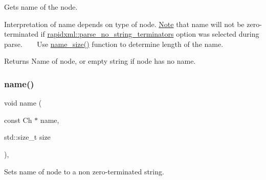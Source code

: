 Gets name of the node. 

Interpretation of name depends on type of node. \mbox{\hyperlink{classNote}{Note}} that name will not be zero-\/terminated if \mbox{\hyperlink{namespacerapidxml_a9cae3801e70437cbc410c24bf6be691c}{rapidxml\+::parse\+\_\+no\+\_\+string\+\_\+terminators}} option was selected during parse. ~\newline
~\newline
 Use \mbox{\hyperlink{classrapidxml_1_1xml__base_ad01e2eff02202b130baad012d1ed7328}{name\+\_\+size()}} function to determine length of the name. \begin{DoxyReturn}{Returns}
Name of node, or empty string if node has no name. 
\end{DoxyReturn}
\mbox{\label{classrapidxml_1_1xml__base_a4e7e23d06d48126c65b1f6266acfba5c}} 
\subsubsection{\texorpdfstring{name()}{name()}\hspace{0.1cm}{\footnotesize\ttfamily [2/3]}}
{\footnotesize\ttfamily void name (\begin{DoxyParamCaption}\item[{const Ch $\ast$}]{name,  }\item[{std\+::size\+\_\+t}]{size }\end{DoxyParamCaption})\hspace{0.3cm}{\ttfamily [inline]}, {\ttfamily [inherited]}}



Sets name of node to a non zero-\/terminated string. 

